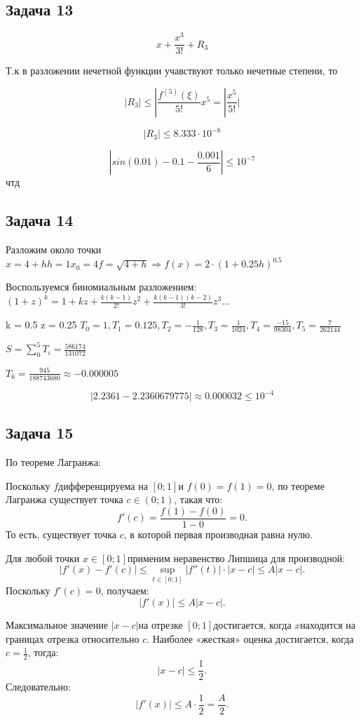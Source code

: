 \documentclass[a4paper,12pt]{article}
\begin{document}
\subsection{Задача 13}
\[
x + \frac{x^3}{3!} + R_3
\]

Т.к в разложении нечетной функции учавствуют только нечетные степени, то

\[
|R_3| \le |\frac{f^{(5)}(\xi)}{5!}x^5 = |\frac{x^5}{5!}|
\]

\[
|R_3| \le 8.333\cdot 10^{-8}
\]

\[
|sin(0.01)-0.1-\frac{0.001}{6}| \le 10^{-7}
\]
чтд

\subsection{Задача 14}
Разложим около точки $x = 4 + h h = 1 x_0 = 4 f = \sqrt{4 + h} \Rightarrow f(x) = 2 \cdot \left(1 + 0.25h\right)^{0.5}$

Воспользуемся биномиальным разложением: $(1+z)^k=1+kz+\frac{k(k-1)}{2!}z^2+\frac{k(k-1)(k-2)}{3!}z^3...$

k = 0.5 z = 0.25 $T_0 = 1, T_1=0.125, T_2 = -\frac{1}{128}, T_3 = \frac{1}{1024}, T_4 = \frac{-15}{98304}, T_5 = \frac{7}{262144}$

$S=\sum_{0}^5 T_i = \frac{586174}{131072}$

$T_6=\frac{945}{188743680} \approx -0.000005$

\[
    \left|2.2361 - 2.2360679775\right| \approx 0.000032 \leq 10^{-4}
\]

\subsection{Задача 15}
По теореме Лагранжа:

Поскольку $ f $дифференцируема на $[0;1]$и $ f(0) = f(1) = 0 $, по теореме Лагранжа существует точка $ c \in (0;1) $, такая что:
\[
f'(c) = \frac{f(1) - f(0)}{1 - 0} = 0.
\]
То есть, существует точка $ c $, в которой первая производная равна нулю.

Для любой точки $ x \in [0;1] $применим неравенство Липшица для производной:
\[
|f'(x) - f'(c)| \leq \sup_{t \in [0;1]} |f''(t)| \cdot |x - c| \leq A |x - c|.
\]
Поскольку $ f'(c) = 0 $, получаем:
\[
|f'(x)| \leq A |x - c|.
\]

Максимальное значение $ |x - c| $на отрезке $[0;1]$достигается, когда $ x $находится на границах отрезка относительно $ c $. Наиболее «жесткая» оценка достигается, когда $ c = \frac{1}{2} $, тогда:
\[
|x - c| \leq \frac{1}{2}.
\]
Следовательно:
\[
|f'(x)| \leq A \cdot \frac{1}{2} = \frac{A}{2}.
\]
\end{document}
